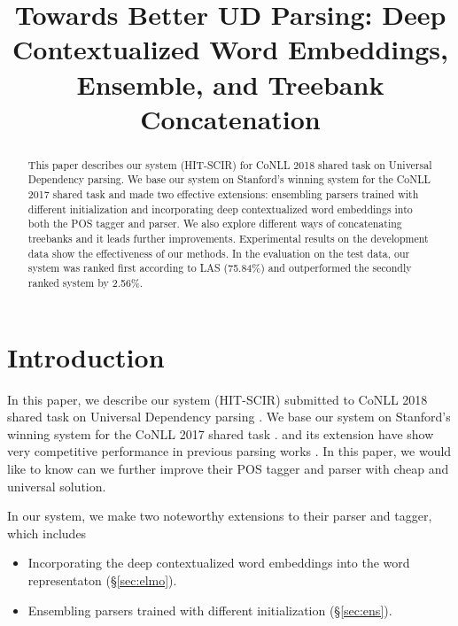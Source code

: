 \documentclass[11pt,a4paper]{article}
\title{Towards Better UD Parsing: Deep Contextualized Word Embeddings, Ensemble, and Treebank Concatenation}
\author{}
\date{}
\begin{document}
\maketitle

\newcommand{\udst}[0]{\emph{CoNLL 2018 UD Shared Task}}

\begin{abstract}
This paper describes our system (HIT-SCIR)
for  CoNLL 2018 shared
task on Universal Dependency parsing.
We base our system on Stanford's winning system for the CoNLL 2017 shared task
and made two effective extensions: ensembling
parsers trained with different initialization
and incorporating deep contextualized
word embeddings into both the POS
tagger and parser.
We also explore different ways of concatenating treebanks
and it leads further improvements.
Experimental results on the development data
show the effectiveness of our methods.
In the evaluation on the test data,
our system was ranked first according to LAS (75.84\%)
and outperformed the secondly ranked system by 2.56\%.

\end{abstract}

\section{Introduction}

In this paper, we describe our system (HIT-SCIR) submitted to CoNLL 2018 shared
task on Universal Dependency parsing \cite{udst:overview}.
We base our system on Stanford's winning system \citep[\S\ref{sec:biaffine}]{dozat-qi-manning:2017:K17-3}
for the CoNLL 2017 shared task \cite{udst:overview2017}.
\citet{DBLP:journals/corr/DozatM16} and
its extension \cite{dozat-qi-manning:2017:K17-3} have
show very competitive performance in previous parsing works \cite{ma-hovy:2017:I17-1,shi-huang-lee:2017:EMNLP2017,N18-1088,DBLP:journals/corr/abs-1805-01087}.
In this paper, we would like to know can we further improve
their POS tagger and parser with cheap and universal solution.

In our system, we make two noteworthy extensions to their parser and tagger,
which includes
\begin{itemize}
	\item Incorporating the deep contextualized word embeddings \cite[ELMo]{N18-1202} into the word representaton (\S\ref{sec:elmo}).
	\item Ensembling parsers trained with different initialization (\S\ref{sec:ens}).
\end{itemize}
\end{document}
